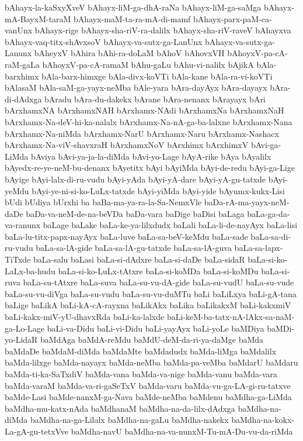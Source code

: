 {bAhayx-la-kaSxyXveV
bAhayx-liM-ga-dhA-raNa
bAhayx-liM-ga-saMga
bAhayx-mA-BayxM-taraM
bAhayx-maM-ta-ra-mA-di-mamf
bAhayx-parx-paM-ca-vanUnx
bAhayx-rige
bAhayx-sha-riV-ra-dalilx
bAhayx-sha-riV-raveV
bAhayxva
bAhayx-vaq-titx-shAvxsoV
bAhayx-va-sutx-ga-LanUnx
bAhayx-va-sutx-ga-Lanunx
bAheyxV
bAhira
bAhi-ra-doLaM
bAhoV
bAhovxVH
bAhoyxV-pa-cA-raM-gaLa
bAhoyxV-pa-cA-ramaM
bAhu-gaLu
bAhu-vi-nalilx
bAjikA
bAla-barxhimx
bAla-barx-himxge
bAla-divx-koVTi
bAla-kane
bAla-ra-vi-koVTi
bAlasaM
bAla-saM-ga-yayx-neMba
bAle-yara
bAra-dayAyx
bAra-dayayx
bAra-di-dAdxga
bAradu
bAra-du-dakekx
bArane
bAra-nenanx
bArayayx
bAri
bArxhamxNA
bArxhamxNAH
bArxhamx-NAdi
bArxhamxNa
bArxhamxNaH
bArxhamx-Na-deV-hi-ka-nalalx
bArxhamx-Na-nA-ga-ba-lalxne
bArxhamx-Nana
bArxhamx-Na-niMda
bArxhamx-NarU
bArxhamx-Naru
bArxhamx-Nashacx
bArxhamx-Na-viV-shavxraH
bArxhamxNoV
bArxhimx
bArxhimxV
bAvi-ga-LiMda
bAviya
bAvi-ya-ja-la-diMda
bAvi-yo-Lage
bAyA-rike
bAya
bAyalilx
bAyedx-re-ye-neM-bu-denanx
bAyetitx
bAyi
bAyiMda
bAyi-de-redu
bAyi-ga-Lige
bAyige
bAyi-lalx-di-ru-vudu
bAyi-yAda
bAyi-yA-dare
bAyi-yA-gu-tatxde
bAyi-yeMdu
bAyi-ye-ni-si-ko-LuLx-tatxde
bAyi-yiMda
bAyi-yide
bAyumx-kukx-Lisi
bUdi
bUdiya
bUrxhi
ba
baBa-ma-ya-ra-la-Sa-NemxVle
baDa-rA-ma-yayx-neM-daDe
baDa-va-neM-de-na-beVDa
baDa-vara
baDige
baDisi
baLaga
baLa-ga-da-va-ranunx
baLage
baLake
baLa-ke-ya-lilxdudx
baLali
baLa-li-de-nayAyx
baLa-lisi
baLa-lu-titx-papx-nayAyx
baLa-luve
baLa-sa-beV-keMdu
baLa-sade
baLa-sa-di-ru-vudu
baLa-sa-lA-gide
baLa-sa-lA-gu-tatxde
baLa-sa-lA-guva
baLa-sa-lapx-TiTxde
baLa-salu
baLasi
baLa-si-dAdxre
baLa-si-daDe
baLa-sidaR
baLa-si-ko-LaLx-ba-hudu
baLa-si-ko-LuLx-tAtxre
baLa-si-koMDa
baLa-si-koMDu
baLa-si-ruva
baLa-su-tAtxre
baLa-suva
baLa-su-vu-dA-gide
baLa-su-vudU
baLa-su-vude
baLa-su-vu-diVga
baLa-su-vudu
baLa-su-vu-duMTu
baLi
baLiLxya
baLi-gA-tana
baLige
baLikA
baLi-kA-cA-rayxna
baLikAkx
baLika
baLikakxM
baLi-kakxmiV
baLi-kakx-miV-yU-dhavxRda
baLi-ka-lalxde
baLi-keM-ba-tatx-nA-lAkx-sa-naM-ga-Lo-Lage
baLi-va-Didu
baLi-vi-Didu
baLi-yayAyx
baLi-yoLe
baMDiya
baMDi-yo-LidaR
baMdAga
baMdA-reMdu
baMdU-deM-da-ri-ya-daMge
baMda
baMdaDe
baMdaM-diMda
baMdaMte
baMdadudx
baMda-liMga
baMdalilx
baMda-lilxge
baMda-nayayx
baMda-neMba
baMda-pa-veMba
baMdarU
baMdaru
baMda-ti-ka-SaTxdiV
baMda-vana
baMda-va-nige
baMda-vanu
baMda-vara
baMda-varaM
baMda-va-ri-gaSeTxV
baMda-varu
baMda-vu-ga-LA-gi-ru-tatxve
baMde-Lasi
baMde-nanxM-ga-Nava
baMde-neMba
baMdenu
baMdha-ga-LiMda
baMdha-mu-katx-nAda
baMdhanaM
baMdha-na-da-lilx-dAdxga
baMdha-na-diMda
baMdha-na-ga-Lilalx
baMdha-na-gaLu
baMdha-nakekx
baMdha-na-kokx-La-gA-gu-tetxVve
baMdha-navU
baMdha-na-va-nunxM-Tu-mA-Du-vu-da-riMda
}
